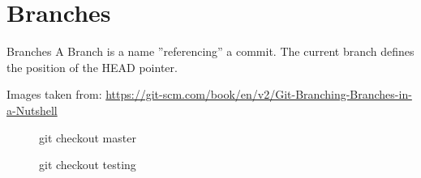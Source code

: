 \section{Branches}
\begin{frame}{Branches}
	A Branch is a name ''referencing'' a commit. The current branch defines the position of the HEAD pointer.
	\vspace{2cm}
	
	Images taken from: \url{https://git-scm.com/book/en/v2/Git-Branching-Branches-in-a-Nutshell} 
	\framebreak
	\begin{figure}
		\centering
		\caption{git checkout master}
	\end{figure}
	

	\framebreak
	\begin{figure}
		\centering
		\caption{git checkout testing}
	\end{figure}


\end{frame}
